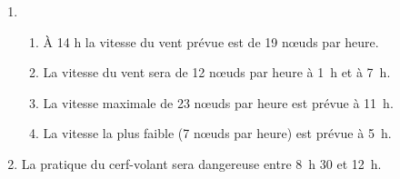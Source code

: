 
\medskip

%
%
%

\begin{enumerate}
\item 
	\begin{enumerate}
		\item %
À 14 h la vitesse du vent prévue est de 19 nœuds par heure.
		\item %
La vitesse du vent sera de 12 nœuds par heure à 1~h et à 7~h.
		\item %
La vitesse maximale de 23 nœuds par heure est prévue à 11~h.
		\item %
		
La vitesse la plus faible (7 nœuds par heure) est prévue à 5~h.
	\end{enumerate}
\item %


La pratique du cerf-volant sera dangereuse entre 8~h 30 et 12~h.
\end{enumerate}

\vspace{0,5cm}

